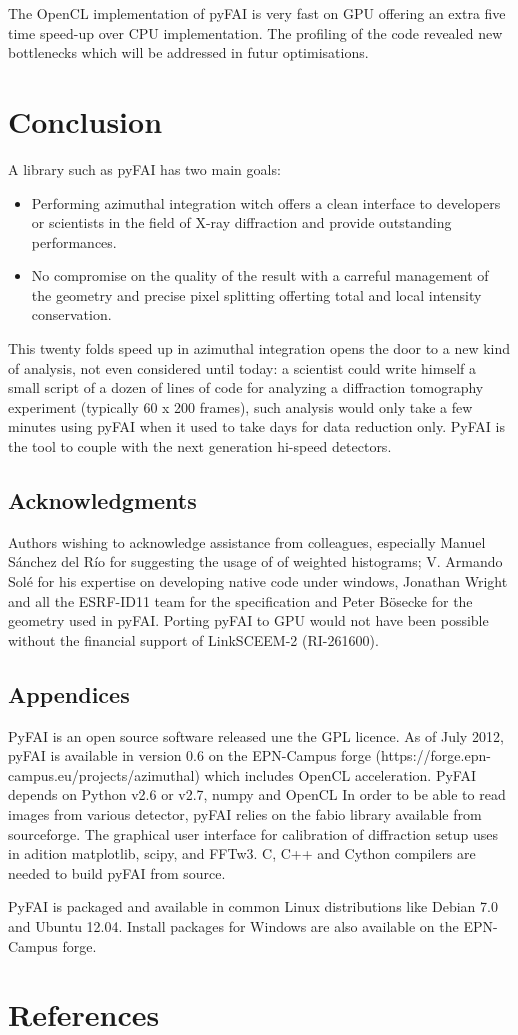 \documentclass[a4paper]{jpconf}
\begin{document}
The OpenCL implementation of pyFAI is very fast on GPU offering an extra five
time speed-up over CPU implementation. The profiling of the code revealed new
bottlenecks which will be addressed in futur optimisations.

\section{Conclusion}


A library such as pyFAI has two main goals:
\begin{itemize}
\item Performing azimuthal integration witch offers a clean interface to
developers or scientists in the field of X-ray diffraction and provide outstanding performances.
\item No compromise on the quality of the result with a carreful management of
the geometry and precise pixel splitting offerting total and local intensity
conservation.
\end{itemize}

This twenty folds speed up in azimuthal integration opens the door to a new
kind of analysis, not even considered until today: a scientist could write
himself a small script of a dozen of lines of code for analyzing a diffraction
tomography experiment (typically 60 x 200 frames), such analysis would only
take a few minutes using pyFAI when it used to take days for data reduction only.
PyFAI is the tool to couple with the next generation hi-speed detectors.

\subsection*{Acknowledgments}
Authors wishing to acknowledge assistance from
colleagues, especially Manuel S\'anchez del R\'io for suggesting the usage of
of weighted histograms;
V. Armando Sol\'e for his expertise on developing native code under windows,
Jonathan Wright and all the ESRF-ID11 team for the specification and Peter B\"osecke for
the geometry used in pyFAI. Porting pyFAI to GPU would not have been
possible without the financial support of LinkSCEEM-2 (RI-261600).

\subsection*{Appendices}
PyFAI is an open source software released une the GPL licence.
As of July 2012, pyFAI is available in version 0.6 on the EPN-Campus forge
(https://forge.epn-campus.eu/projects/azimuthal) which includes OpenCL
acceleration.
PyFAI depends on Python v2.6 or v2.7, numpy\cite{numpy} and OpenCL\cite{opencl}
In order to be able to read images from various detector, pyFAI relies on the
fabio library available from sourceforge. The graphical user interface for
calibration of diffraction setup uses in adition matplotlib\cite{matplotlib},
scipy\cite{scipy}, and FFTw3\cite{fftw}.
C, C++ and Cython compilers are needed to build pyFAI from source.

PyFAI is packaged and available in common Linux distributions like Debian
7.0 and Ubuntu 12.04. Install packages for Windows are also
available on the EPN-Campus forge.

 \section*{References}


\end{document}
